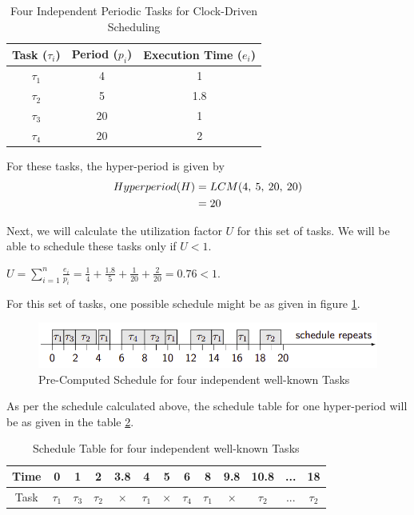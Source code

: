 \documentclass[12pt]{report}
\begin{document}
\begin{table}[h]
\centering
\begin{tabular}{|c|c|c|}
 \hline
 \textbf{Task ($\tau_i$)} &  \textbf{Period ($p_i$)} & \textbf{Execution Time ($e_i$)}\\
 \hline \hline
  $\tau_1$ & 4 & 1 \\ 
 \hline
 $\tau_2$ & 5 & 1.8 \\
 \hline
 $\tau_3$ & 20 & 1 \\ 
 \hline
 $\tau_4$ & 20 & 2\\
 \hline
\end{tabular}
\caption{Four Independent Periodic Tasks for Clock-Driven Scheduling}
\label{table:tasks}
\end{table}


For these tasks, the hyper-period is given by
\begin{align*} 
Hyper\-period (H) &= LCM(4, \: 5, \: 20, \: 20) \\
 &=  20
\end{align*}


Next, we will calculate the utilization factor $U$ for this set of tasks. We will be able to schedule these tasks only if $U < 1$. 

\begin{center}
 $U =  \sum_{i=1}^{n} \frac{e_i}{p_i} = \frac{1}{4} + \frac{1.8}{5} + \frac{1}{20} + \frac{2}{20} = 0.76 < 1$. 
\end{center} 

For this set of tasks, one possible schedule might be as given in figure \ref{fig:schedule}. 

\begin{figure}[h]
    \centering
    \includegraphics[width=\textwidth]{images/cyclic.png}
    \caption{Pre-Computed Schedule for four independent well-known Tasks}
\label{fig:schedule}
\end{figure}
As per the schedule calculated above, the schedule table for one hyper-period will be as given in the table \ref{table:23}. 

\begin{table}[h]
\centering
\begin{tabular}{|c|c|c|c|c|c|c|c|c|c|c|c|c|}
 \hline
Time & 0 & 1 & 2 & 3.8 & 4 & 5 & 6 & 8 & 9.8 & 10.8 & ... & 18 \\
\hline 
Task & $\tau_1$ & $\tau_3$ & $\tau_2$ & $\times$ & $\tau_1$ & $\times$ & $\tau_4$ & $\tau_1$ & $\times$ & $\tau_2$ & ... & $\tau_2$ \\
\hline
\end{tabular}
\caption{Schedule Table for four independent well-known Tasks}
\label{table:23}
\end{table}
\end{document}
